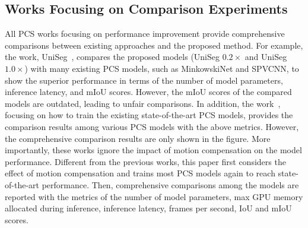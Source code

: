 \subsection{Works Focusing on Comparison Experiments}
All PCS works focusing on performance improvement provide comprehensive comparisons between existing approaches and the proposed method. For example, the work, UniSeg~\cite{openpcseg2023}, compares the proposed models (UniSeg $0.2\times$ and UniSeg $1.0\times$) with many existing PCS models, such as MinkowskiNet and SPVCNN, to show the superior performance in terms of the number of model parameters, inference latency, and mIoU scores. However, the mIoU scores of the compared models are outdated, leading to unfair comparisons. In addition, the work~\cite{empir24}, focusing on how to train the existing state-of-the-art PCS models, provides the comparison results among various PCS models with the above metrics. However, the comprehensive comparison results are only shown in the figure. More importantly, these works ignore the impact of motion compensation on the model performance. Different from the previous works, this paper first considers the effect of motion compensation and trains most PCS models again to reach state-of-the-art performance. Then, comprehensive comparisons among the models are reported with the metrics of the number of model parameters, max GPU memory allocated during inference, inference latency, frames per second, IoU and mIoU scores.